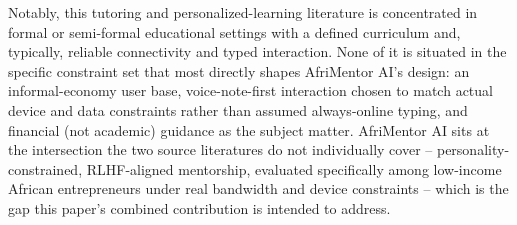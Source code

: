 Notably, this tutoring and personalized-learning literature is concentrated in formal or semi-formal educational settings with a defined curriculum and, typically, reliable connectivity and typed interaction. None of it is situated in the specific constraint set that most directly shapes AfriMentor AI's design: an informal-economy user base, voice-note-first interaction chosen to match actual device and data constraints rather than assumed always-online typing, and financial (not academic) guidance as the subject matter. AfriMentor AI sits at the intersection the two source literatures do not individually cover -- personality-constrained, RLHF-aligned mentorship, evaluated specifically among low-income African entrepreneurs under real bandwidth and device constraints -- which is the gap this paper's combined contribution is intended to address.
